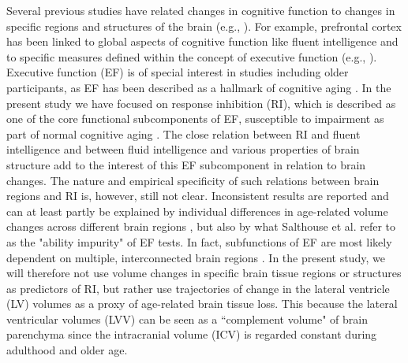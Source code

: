 \documentclass[10pt,letterpaper]{article}
\begin{document}
Several previous studies have related changes in cognitive function to changes in specific regions and structures of the brain (e.g., \cite{McDonald2012,Aljondi2018,Gorbach2017,Pudas2018}). For example, prefrontal cortex has been linked to  global aspects of cognitive function like fluent intelligence \cite{Yuan2018} and to specific measures defined within the concept of executive function (e.g., \cite{Cardenas2011,Gunning-Dixon2003}). Executive function (EF) is of special interest in studies including older participants, as EF has been described as a hallmark of cognitive aging \cite{Buckner2004,Turner2012}. In the present study we have focused on response inhibition (RI), which is described as one of the core functional subcomponents of EF\cite{Friedman2017}, susceptible to impairment as part of normal cognitive aging \cite{Stuss2000,Adolfsdottir2017}. The close relation between RI and fluent intelligence \cite{Salthouse2003} and between fluid intelligence and various properties of brain structure \cite{Yuan2018} add to the interest of this EF subcomponent in relation to brain changes. 
The nature and empirical specificity of such relations between brain regions and RI is, however, still not clear.  Inconsistent results are reported and can at least partly be explained by individual differences in age-related volume changes across different brain regions \cite{Leong2017}, but also by what Salthouse et al. \cite{Salthouse2003} refer to as the "ability impurity" of EF tests. In fact, subfunctions of EF are most likely dependent on multiple, interconnected brain regions \cite{Friedman2017}. 
In the present study, we will therefore not use volume changes in specific brain tissue regions or structures as predictors of RI, but rather use trajectories of change in the lateral ventricle (LV) volumes as a proxy of age-related brain tissue loss. 
This because the lateral ventricular volumes (LVV) can be seen as a ``complement volume" of brain parenchyma since the intracranial volume (ICV)  
is regarded constant during adulthood and older age. \\
\end{document}
